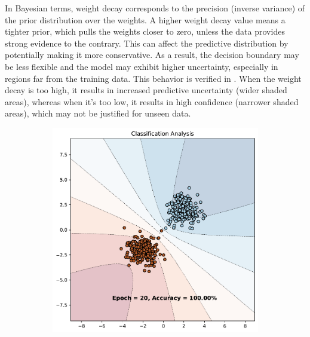 In Bayesian terms, weight decay corresponds to the precision (inverse variance) of the prior distribution over the weights. A higher weight decay value means a tighter prior, which pulls the weights closer to zero, unless the data provides strong evidence to the contrary. This can affect the predictive distribution by potentially making it more conservative. As a result, the decision boundary may be less flexible and the model may exhibit higher uncertainty, especially in regions far from the training data. This behavior is verified in . When the weight decay is too high, it results in increased predictive uncertainty (wider shaded areas), whereas when it's too low, it results in high confidence (narrower shaded areas), which may not be justified for unseen data.

\begin{figure}[H]
    \centering
    \begin{subfigure}{0.45\textwidth}
        \includegraphics[width=\textwidth]{laplace_approx_0.5.pdf}
        \caption{}
        \label{subfig:weight_decay_high}
    \end{subfigure}%
    \begin{subfigure}{0.45\textwidth}

\end{subfigure}
\end{figure}
